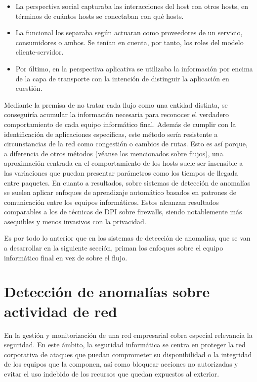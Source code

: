\begin{itemize}
    \item La perspectiva social capturaba las interacciones del host con otros hosts, en términos de cuántos hosts se conectaban con qué hosts.
    \item La funcional los separaba según actuaran como proveedores de un servicio, consumidores o ambos. Se tenían en cuenta, por tanto, los roles del modelo cliente-servidor.
    \item Por último, en la perspectiva aplicativa se utilizaba la información por encima de la capa de transporte con la intención de distinguir la aplicación en cuestión.
\end{itemize}

Mediante la premisa de no tratar cada flujo como una entidad distinta, se conseguiría acumular la información necesaria para reconocer el verdadero comportamiento de cada equipo informático final.
Además de cumplir con la identificación de aplicaciones específicas, este método sería resistente a circunstancias de la red como congestión o cambios de rutas.
Esto es así porque, a diferencia de otros métodos (véanse los mencionados sobre flujos), una aproximación centrada en el comportamiento de los hosts
suele ser insensible a las variaciones que puedan presentar parámetros como los tiempos de llegada entre paquetes.
En cuanto a resultados, sobre sistemas de detección de anomalías se suelen aplicar enfoques de aprendizaje automático basados en patrones de comunicación entre los equipos informáticos.
Estos alcanzan resultados comparables a los de técnicas de DPI sobre firewalls, siendo notablemente más asequibles y menos invasivos con la privacidad.

Es por todo lo anterior que en los sistemas de detección de anomalías, que se van a desarrollar en la siguiente sección, priman los enfoques sobre el equipo informático final en vez de sobre el flujo.

\section{Detección de anomalías sobre actividad de red}\label{detectanomsobreactividadred}

En la gestión y monitorización de una red empresarial cobra especial relevancia la seguridad.
En este ámbito, la seguridad informática se centra en proteger la red corporativa de ataques que puedan comprometer su disponibilidad o la integridad de los equipos que la componen, así como
bloquear acciones no autorizadas y evitar el uso indebido de los recursos que quedan expuestos al exterior.

